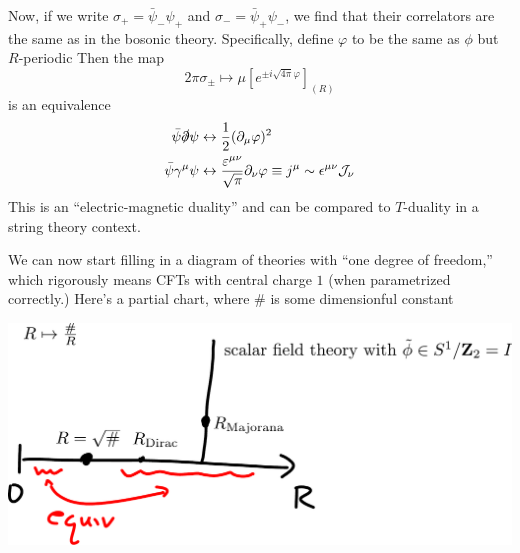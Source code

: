 Now, if we write $\sigma_+ = \bar \psi_- \psi_+$ and $\sigma_- = \bar \psi_+ \psi_-$, we find that their correlators are the same as in the bosonic theory.
Specifically, define $\varphi$ to be the same as $\phi$ but $R$-periodic 
Then the map
\[
2 \pi \sigma_\pm \mapsto \mu \left[ e^{\pm i \sqrt{4\pi} \varphi} \right]_{(R)}
\]
is an equivalence
\begin{align*}
\bar \psi \slashed \partial \psi &\leftrightarrow \frac{1}{2} (\partial_\mu \varphi)^2\\
\bar \psi \gamma^\mu \psi &\leftrightarrow \frac{\varepsilon^{\mu\nu}}{\sqrt \pi} \partial_\nu \varphi \equiv j^\mu \sim \epsilon^{\mu \nu} \mathcal{J}_\nu
\end{align*}
This is an ``electric-magnetic duality'' and can be compared to $T$-duality in a string theory context.

We can now start filling in a diagram of theories with ``one degree of freedom,'' which rigorously means CFTs with central charge $1$ (when parametrized correctly.)
Here's a partial chart, where $\#$ is some dimensionful constant 
\begin{center}
\includegraphics[width = 7in]{fig/lecture3CFTchart.pdf}
\end{center}





